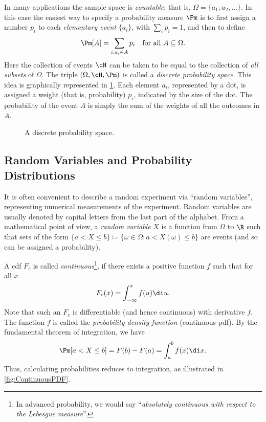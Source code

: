 In many applications the sample space is \textit{countable}; that is, $\Omega = \{a_1, a_2, \dots\}$. In this case the easiest way to specify a probability measure $\Pm$ is to first assign a number $p_i$ to each \textit{elementary event} $\{a_i\}$, with $\sum_i p_i = 1$, and then to define
\begin{equation*}
	\Pm[A] = \sum_{i: a_i \in A} p_i \quad \text{for all } A \subseteq \Omega.
\end{equation*}
Here the collection of events $\cH$ can be taken to be equal to the collection of \textit{all subsets} of $\Omega$. The triple $(\Omega, \cH, \Pm)$ is called a \textit{discrete probability space}. This idea is graphically represented in \cref{fig:DiscreteProbSpace}. Each element $a_i$, represented by a dot, is assigned a weight (that is, probability) $p_i$, indicated by the size of the dot. The probability of the event $A$ is simply the sum of the weights of all the outcomes in $A$.

\begin{figure}[H]
	\centering
	
	\caption{A discrete probability space.}
	\label{fig:DiscreteProbSpace}
\end{figure}

\subsection{Random Variables and Probability Distributions}
It is often convenient to describe a random experiment via ``random variables'', representing numerical measurements of the experiment. Random variables are usually denoted by capital letters from the last part of the alphabet. From a mathematical point of view, a \textit{random variable} $X$ is a function from $\Omega$ to $\R$ such that sets of the form $\{a < X \le b\} \coloneqq \{\omega \in \Omega : a < X(\omega) \le b\}$ are events (and so can be assigned a probability).

A cdf $F_c$ is called \textit{continuous}\footnote{In advanced probability, we would say ``\textit{absolutely continuous with respect to the Lebesgue measure}''.}, if there exists a positive function $f$ such that for all $x$
\begin{equation}
	F_c(x) = \int_{-\infty}^x f(u) \di u. \label{eq:ContinuousCDF}
\end{equation}
Note that such an $F_c$ is differentiable (and hence continuous) with derivative $f$. The function $f$ is called the \textit{probability density function} (continuous pdf). By the fundamental theorem of integration, we have
\begin{equation*}
	\Pm[a < X \le b] = F(b) - F(a) = \int_a^b f(x) \di x.
\end{equation*}
Thus, calculating probabilities reduces to integration, as illustrated in \cref{fig:ContinuousPDF}.

